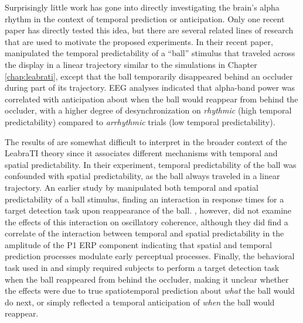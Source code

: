 \documentclass[defaultstyle,12pt]{thesis}
\begin{document}
{Surprisingly little work has gone into directly investigating the brain's alpha rhythm in the context of temporal prediction or anticipation. Only one recent paper has directly tested this idea, but there are several related lines of research that are used to motivate the proposed experiments. In their recent paper,  manipulated the temporal predictability of a ``ball'' stimulus that traveled across the display in a linear trajectory similar to the simulations in Chapter \ref{chap:leabrati}, except that the ball temporarily disappeared behind an occluder during part of its trajectory. EEG analyses indicated that alpha-band power was correlated with anticipation about when the ball would reappear from behind the occluder, with a higher degree of desynchronization on \textit{rhythmic} (high temporal predictability) compared to \textit{arrhythmic} trials (low temporal predictability).

The results of  are somewhat difficult to interpret in the broader context of the LeabraTI theory since it associates different mechanisms with temporal and spatial predictability. In their experiment, temporal predictability of the ball was confounded with spatial predictability, as the ball always traveled in a linear trajectory. An earlier study by  manipulated both temporal and spatial predictability of a ball stimulus, finding an interaction in response times for a target detection task upon reappearance of the ball. , however, did not examine the effects of this interaction on oscillatory coherence, although they did find a correlate of the interaction between temporal and spatial predictability in the amplitude of the P1 ERP component indicating that spatial and temporal prediction processes modulate early perceptual processes. Finally, the behavioral task used in  and  simply required subjects to perform a target detection task when the ball reappeared from behind the occluder, making it unclear whether the effects were due to true spatiotemporal prediction about \textit{what} the ball would do next, or simply reflected a temporal anticipation of \textit{when} the ball would reappear. %

}
\end{document}
